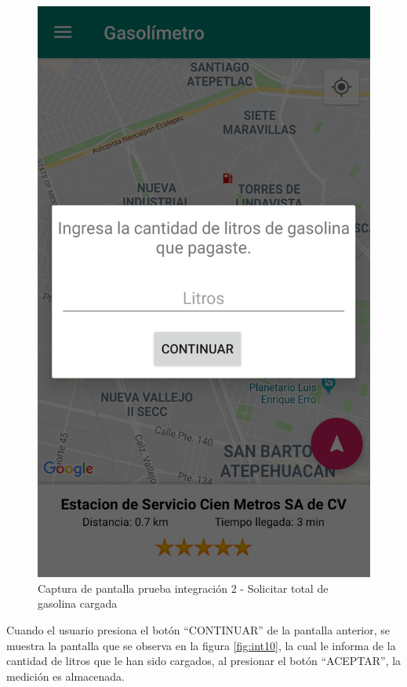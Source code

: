 \begin{figure}[H]
	\centering
	\includegraphics[scale=.2]{Capitulo6/integracion/software/images/9}
	\caption{Captura de pantalla prueba integración 2 - Solicitar total de gasolina cargada}
	\label{fig:int9}
\end{figure}

Cuando el usuario presiona el botón ``CONTINUAR'' de la pantalla anterior, se muestra la pantalla que se observa en la figura \ref{fig:int10}, la cual le informa de la cantidad de litros que le han sido cargados, al presionar el botón ``ACEPTAR'', la medición es almacenada.

